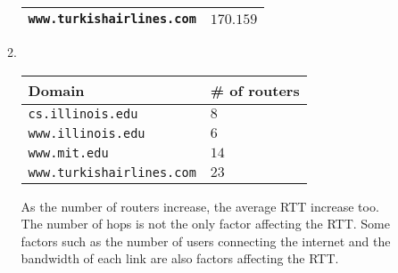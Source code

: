 \documentclass[10pt, a4paper]{article}
\begin{document}
\begin{enumerate}
\begin{enumerate}
\begin{tabular}{ll}
        \texttt{www.turkishairlines.com} & $170.159$\\
        \bottomrule
        \end{tabular}
    \item\mbox{}\\
        \begin{tabular}{ll}
        \toprule
        Domain & \# of routers\\
        \midrule
        \texttt{cs.illinois.edu} & $8$\\
        \texttt{www.illinois.edu} & $6$\\
        \texttt{www.mit.edu} & $14$\\
        \texttt{www.turkishairlines.com} & $23$\\
        \bottomrule
        \end{tabular}

        As the number of routers increase, the average RTT increase too.\\
        The number of hops is not the only factor affecting the RTT\@. Some factors such as the number of users connecting the internet and the bandwidth of each link are also factors affecting the RTT\@.
    \end{enumerate}
\end{enumerate}
\end{document}
